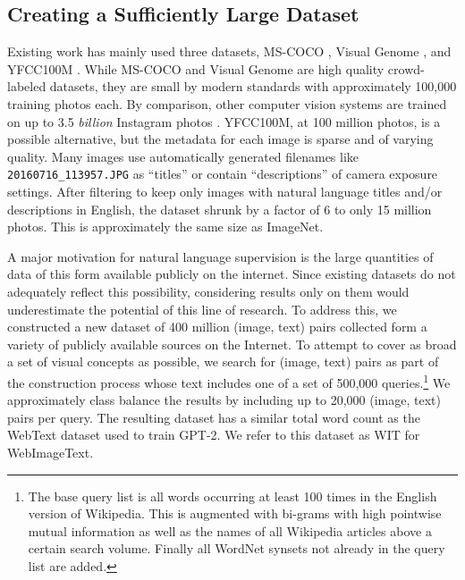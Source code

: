 \documentclass{article}
\begin{document}
\subsection{Creating a Sufficiently Large Dataset}\label{subsection:creating-large-dataset}

Existing work has mainly used three datasets, MS-COCO \citep{lin2014microsoft}, Visual Genome \citep{krishna2017visual}, and YFCC100M \citep{thomee2016yfcc100m}. While MS-COCO and Visual Genome are high quality crowd-labeled datasets, they are small by modern standards with approximately 100,000 training photos each. By comparison, other computer vision systems are trained on up to 3.5 \textit{billion} Instagram photos \citep{mahajan2018exploring}. YFCC100M, at 100 million photos, is a possible alternative, but the metadata for each image is sparse and of varying quality. Many images use automatically generated filenames like \texttt{20160716\_113957.JPG} as ``titles'' or contain ``descriptions'' of camera exposure settings. After filtering to keep only images with natural language titles and/or descriptions in English, the dataset shrunk by a factor of 6 to only 15 million photos. This is approximately the same size as ImageNet.

A major motivation for natural language supervision is the large quantities of data of this form available publicly on the internet. Since existing datasets do not adequately reflect this possibility, considering results only on them would underestimate the potential of this line of research. To address this, we constructed a new dataset of 400 million (image, text) pairs collected form a variety of publicly available sources on the Internet. To attempt to cover as broad a set of visual concepts as possible, we search for (image, text) pairs as part of the construction process whose text includes one of a set of 500,000 queries.\footnote{The base query list is all words occurring at least 100 times in the English version of Wikipedia. This is augmented with bi-grams with high pointwise mutual information as well as the names of all Wikipedia articles above a certain search volume. Finally all WordNet synsets not already in the query list are added.} We approximately class balance the results by including up to 20,000 (image, text) pairs per query. The resulting dataset has a similar total word count as the WebText dataset used to train GPT-2. We refer to this dataset as WIT for WebImageText.
\end{document}
